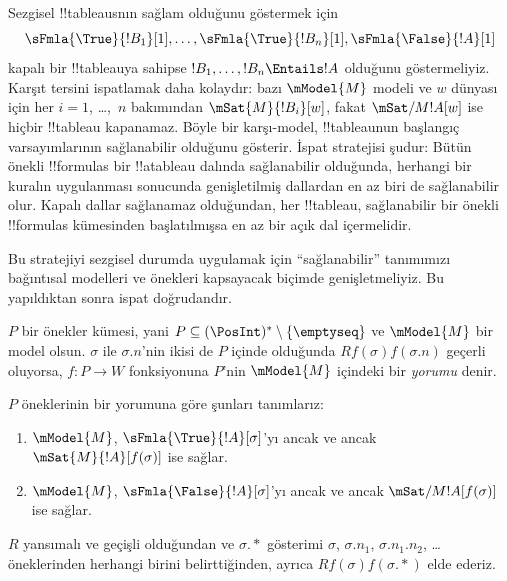 \documentclass[../../../include/open-logic-section]{subfiles}
\begin{document}


\begin{explain}
  Sezgisel !!{tableau}s{}nın sağlam olduğunu göstermek için
  \[
  \sFmla{\True}{!B_1}[1], \dots, \sFmla{\True}{!B_n}[1], \sFmla{\False}{!A}[1]
  \]
  kapalı bir !!{tableau}{}ya sahipse $!B_1, \dots, !B_n \Entails !A$ olduğunu
  göstermeliyiz. Karşıt tersini ispatlamak daha kolaydır: bazı $\mModel{M}$
  modeli ve $w$ dünyası için her $i=1$, \dots,~$n$ bakımından
  $\mSat{M}{!B_i}[w]$, fakat $\mSat/{M}{!A}[w]$ ise hiçbir !!{tableau}
  kapanamaz. Böyle bir karşı-model, !!{tableau}{}nun başlangıç varsayımlarının
  sağlanabilir olduğunu gösterir. İspat stratejisi şudur: Bütün önekli
  !!{formula}s bir !!a{tableau} dalında sağlanabilir olduğunda, herhangi bir
  kuralın uygulanması sonucunda genişletilmiş dallardan en az biri de
  sağlanabilir olur. Kapalı dallar sağlanamaz olduğundan, her !!{tableau},
  sağlanabilir bir önekli !!{formula}s kümesinden başlatılmışsa en az bir açık
  dal içermelidir.

  Bu stratejiyi sezgisel durumda uygulamak için ``sağlanabilir'' tanımımızı
  bağıntısal modelleri ve önekleri kapsayacak biçimde genişletmeliyiz. Bu
  yapıldıktan sonra ispat doğrudandır.
\end{explain}

\begin{defn}
  $P$ bir önekler kümesi, yani $P \subseteq (\PosInt)^*
  \setminus \{\emptyseq\}$ ve $\mModel{M}$ bir model olsun. $\sigma$ ile
  $\sigma.n$'nin ikisi de $P$ içinde olduğunda $Rf(\sigma)f(\sigma.n)$
  geçerli oluyorsa, $f\colon P \to W$ fonksiyonuna $P$'nin $\mModel{M}$
  içindeki bir \emph{yorumu} denir.

  $P$ öneklerinin bir yorumuna göre şunları tanımlarız:
  \begin{enumerate}
  \item $\mModel{M}$, $\sFmla{\True}{!A}[\sigma]$'yı ancak ve ancak
    $\mSat{M}{!A}[f(\sigma)]$ ise sağlar.
  \item $\mModel{M}$, $\sFmla{\False}{!A}[\sigma]$'yı ancak ve ancak
    $\mSat/{M}{!A}[f(\sigma)]$ ise sağlar.
  \end{enumerate}
\end{defn}

$R$ yansımalı ve geçişli olduğundan ve $\sigma.{*}$ gösterimi $\sigma$,
$\sigma.n_1$, $\sigma.n_1.n_2$, \dots{} öneklerinden herhangi birini
belirttiğinden, ayrıca $Rf(\sigma)f(\sigma.{*})$ elde ederiz.
\end{document}
